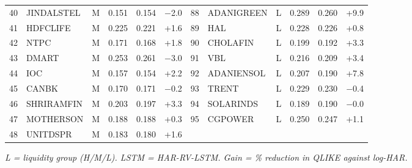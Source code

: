 \begin{table}[H]
\begin{adjustbox}{max width=\textwidth}
\begin{tabular}{rlcrrr|rlcrrr}
40 & JINDALSTEL & M & 0.151 & 0.154 & $-$2.0 & 88 & ADANIGREEN & L & 0.289 & 0.260 & +9.9 \\
41 & HDFCLIFE & M & 0.225 & 0.221 & +1.6 & 89 & HAL & L & 0.228 & 0.226 & +0.8 \\
42 & NTPC & M & 0.171 & 0.168 & +1.8 & 90 & CHOLAFIN & L & 0.199 & 0.192 & +3.3 \\
43 & DMART & M & 0.253 & 0.261 & $-$3.0 & 91 & VBL & L & 0.216 & 0.209 & +3.4 \\
44 & IOC & M & 0.157 & 0.154 & +2.2 & 92 & ADANIENSOL & L & 0.207 & 0.190 & +7.8 \\
45 & CANBK & M & 0.170 & 0.171 & $-$0.2 & 93 & TRENT & L & 0.229 & 0.230 & $-$0.4 \\
46 & SHRIRAMFIN & M & 0.203 & 0.197 & +3.3 & 94 & SOLARINDS & L & 0.189 & 0.190 & $-$0.0 \\
47 & MOTHERSON & M & 0.188 & 0.188 & +0.3 & 95 & CGPOWER & L & 0.250 & 0.247 & +1.1 \\
48 & UNITDSPR & M & 0.183 & 0.180 & +1.6 &  &  & & & &  \\
\bottomrule
\end{tabular}
\end{adjustbox}
\par\smallskip\parbox{0.95\textwidth}{\footnotesize\itshape L = liquidity group (H/M/L). LSTM = HAR-RV-LSTM. Gain = \% reduction in QLIKE against log-HAR.}
\end{table}
